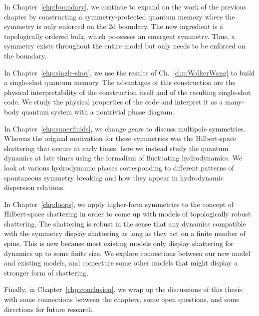 In Chapter~\ref{chp:boundary}, we continue to expand on the work of the previous chapter by constructing a symmetry-protected quantum memory where the symmetry is only enforced on the 2d boundary. The new ingredient is a topologically ordered bulk, which possesses an emergent symmetry. Thus, a symmetry exists throughout the entire model but only needs to be enforced on the boundary. 

In Chapter~\ref{chp:single-shot}, we use the results of Ch.~\ref{chp:WalkerWang} to build a single-shot quantum memory. The advantages of this construction are the physical interpretability of the construction itself and of the resulting single-shot code. We study the physical properties of the code and interpret it as a many-body quantum system with a nontrivial phase diagram.

In Chapter~\ref{chp:superfluids}, we change gears to discuss multipole symmetries. Whereas the original motivation for these symmetries was the Hilbert-space shattering that occurs at early times, here we instead study the quantum dynamics at late times using the formalism of fluctuating hydrodynamics. We look at various hydrodynamic phases corresponding to different patterns of spontaneous symmetry breaking and how they appear in hydrodynamic dispersion relations. 

In Chapter~\ref{chp:loops}, we apply higher-form symmetries to the concept of Hilbert-space shattering in order to come up with models of topologically robust shattering. The shattering is robust in the sense that any dynamics compatible with the symmetry display shattering as long as they act on a finite number of spins. This is new because most existing models only display shattering for dynamics up to some finite size. We explore connections between our new model and existing models, and conjecture some other models that might display a stronger form of shattering.

Finally, in Chapter~\ref{chp:conclusion}, we wrap up the discussions of this thesis with some connections between the chapters, some open questions, and some directions for future research.